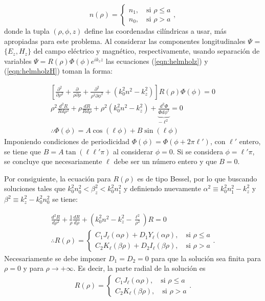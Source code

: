\begin{equation}
	n( \rho ) = 
	\left\{\begin{matrix}
	n_1, \quad \text{si } \rho \le a
	\\
	n_0, \quad \text{si } \rho > a
	\end{matrix}\right.
	,\nonumber
\end{equation}
donde la tupla $(\rho, \phi, z)$ define las coordenadas cilíndricas a usar, más apropiadas para este problema. Al considerar las componentes longitudinales $\Psi$ = $\{E_z, H_z\}$ del campo eléctrico y magnético, respectivamente, usando separación de variables $\Psi =  R(\rho)\Phi(\phi) e^{ik_z z} $ las ecuaciones (\ref{eqn:helmholz}) y (\eqref{eqn:helmholzH}) toman la forma:

\begin{align}
	\left[\frac{\partial^2}{\partial \rho^2} + \frac{\partial}{\rho\partial \rho} + \frac{\partial^2}{\rho^2\partial \phi^2} +\left( k_0^2n^2 - k_z^2 \right)\right]  R(\rho)\Phi(\phi) = 0
	\nonumber
	\\
\rho^2\frac{d^2 R}{Rd\rho^2} + \rho\frac{dR}{Rd\rho} + \rho^2\left( k_0^2n^2 - k_z^2 \right) + \underbrace{\frac{d^2 \Phi}{\Phi d\phi^2}}_{-\ell^2} = 0
\nonumber
\\
\therefore \Phi(\phi) = A\cos(\ell\phi) + B\sin(\ell\phi)
\nonumber
\end{align}
Imponiendo condiciones de periodicidad $\Phi(\phi)=\Phi(\phi + 2\pi \ell')$, con $\ell'$ entero, se tiene que $B=A\tan(\ell \ell'\pi)$ al considerar $\phi=0$. Si se considera $\phi=\ell'\pi$, se concluye que necesariamente $\ell$ debe ser un número entero y que $B=0$.

Por consiguiente, la ecuación para $R(\rho)$ es de tipo Bessel, por lo que buscando soluciones tales que $k_0^2 n_0^2 < \beta_z^2 < k_0^2 n_1^2$ y definiendo nuevamente $\alpha^2 \equiv k_0^2n_1^2 - k_z^2$ y $\beta^2\equiv k_z^2 - k_0^2n_0^2$ se tiene:

\begin{align}
	\frac{d^2 R}{d\rho^2} + \frac{1}{\rho}\frac{dR}{d\rho} + \left( k_0^2n^2 - k_z^2 -\frac{\ell^2}{\rho^2}\right)R  = 0
	\nonumber
	\\
	\therefore R(\rho) = 
	\left\{
	\begin{matrix}	
	C_1 J_\ell (\alpha\rho) + D_1 Y_\ell (\alpha\rho), \quad \text{si } \rho \le a  
	\\
	C_2 K_\ell (\beta\rho) + D_2 I_\ell (\beta\rho), \quad \text{si } \rho > a  
	\end{matrix}
	\right.
	. \nonumber
\end{align}
Necesariamente se debe imponer $D_1 = D_2 = 0$ para que la solución sea finita para $\rho = 0$ y para $\rho \to +\infty$. Es decir, la parte radial de la solución es
\begin{align*}
 R(\rho) = 
	\left\{
	\begin{matrix}	
	C_1 J_\ell (\alpha\rho), \quad \text{si } \rho \le a  
	\\
	C_2 K_\ell (\beta\rho), \quad \text{si } \rho > a  
	\end{matrix}
	\right.
	. \nonumber
\end{align*}


